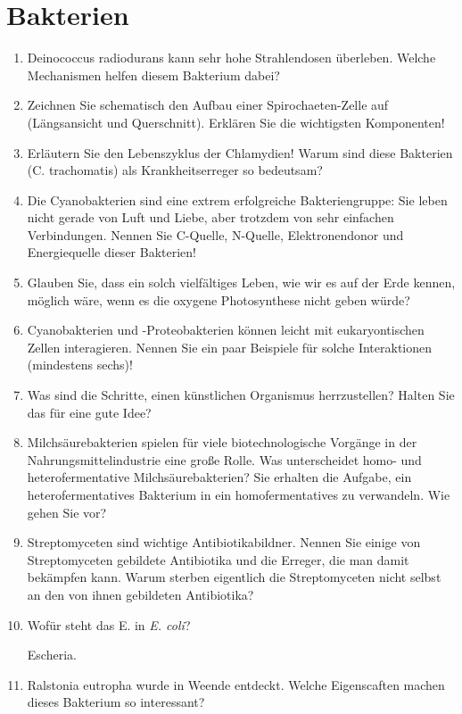 \section{Bakterien}
\begin{enumerate}
	\item Deinococcus radiodurans kann sehr hohe Strahlendosen überleben. Welche Mechanismen helfen diesem Bakterium dabei?
	\item Zeichnen Sie schematisch den Aufbau einer Spirochaeten-Zelle auf (Längsansicht und Querschnitt). Erklären Sie die wichtigsten Komponenten!
	\item Erläutern Sie den Lebenszyklus der Chlamydien! Warum sind diese Bakterien (C. trachomatis) als Krankheitserreger so bedeutsam?
	\item Die Cyanobakterien sind eine extrem erfolgreiche Bakteriengruppe: Sie leben nicht gerade von Luft und Liebe, aber trotzdem von sehr einfachen Verbindungen. Nennen Sie C-Quelle, N-Quelle, Elektronendonor und Energiequelle dieser Bakterien! 
	\item Glauben Sie, dass ein solch vielfältiges Leben, wie wir es auf der Erde kennen, möglich wäre, wenn es die oxygene Photosynthese nicht geben würde?
	\item Cyanobakterien und -Proteobakterien können leicht mit eukaryontischen Zellen interagieren. Nennen Sie ein paar Beispiele für solche Interaktionen (mindestens sechs)!
	\item Was sind die Schritte, einen künstlichen Organismus herrzustellen? Halten Sie das für eine gute Idee?
	\item Milchsäurebakterien spielen für viele biotechnologische Vorgänge in der Nahrungsmittelindustrie eine große Rolle. Was unterscheidet homo- und heterofermentative Milchsäurebakterien? Sie erhalten die Aufgabe, ein heterofermentatives Bakterium in ein homofermentatives zu verwandeln. Wie gehen Sie vor?
	\item Streptomyceten sind wichtige Antibiotikabildner. Nennen Sie einige von Streptomyceten gebildete Antibiotika und die Erreger, die man damit bekämpfen kann. Warum sterben eigentlich die Streptomyceten nicht selbst an den von ihnen gebildeten Antibiotika?
	\item Wofür steht das E. in \emph{E. coli}? 

		Escheria.

	\item Ralstonia eutropha wurde in Weende entdeckt. Welche Eigenscaften machen dieses Bakterium so interessant?
		

\end{enumerate}
